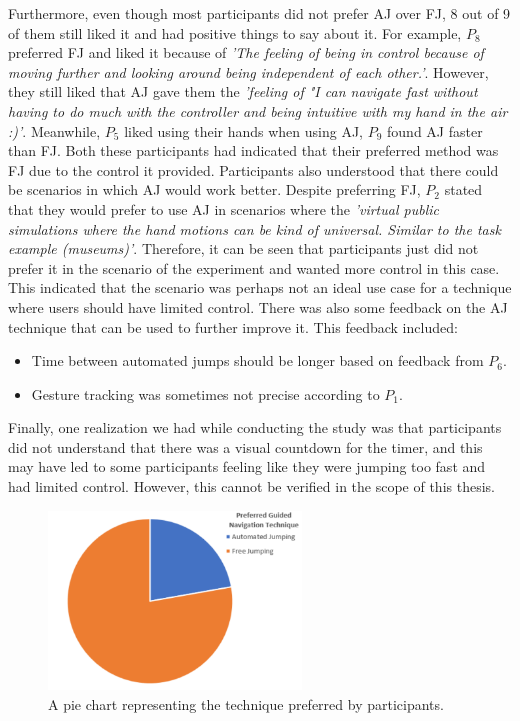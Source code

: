Furthermore, even though most participants did not prefer AJ over FJ, 8 out of 9 of them still liked it and had positive things to say about it. For example, $P_8$ preferred FJ and liked it because of \textit{'The feeling of being in control because of moving further and looking around being independent of each other.'}. However, they still liked that AJ gave them the \textit{'feeling of "I can navigate fast without having to do much with the controller and being intuitive with my hand in the air :)'}. Meanwhile, $P_5$ liked using their hands when using AJ, $P_9$ found AJ faster than FJ. Both these participants had indicated that their preferred method was FJ due to the control it provided. Participants also understood that there could be scenarios in which AJ would work better. Despite preferring FJ, $P_2$ stated that they would prefer to use AJ in scenarios where the \textit{'virtual public simulations where the hand motions can be kind of universal. Similar to the task example (museums)'}. Therefore, it can be seen that participants just did not prefer it in the scenario of the experiment and wanted more control in this case. This indicated that the scenario was perhaps not an ideal use case for a technique where users should have limited control. There was also some feedback on the AJ technique that can be used to further improve it. This feedback included:
\begin{itemize}
	\item Time between automated jumps should be longer based on feedback from $P_6$.
	\item Gesture tracking was sometimes not precise according to $P_1$.
\end{itemize}

Finally, one realization we had while conducting the study was that participants did not understand that there was a visual countdown for the timer, and this may have led to some participants feeling like they were jumping too fast and had limited control. However, this cannot be verified in the scope of this thesis.

\begin{figure}[]
	\centering
	\includegraphics[width=0.6\textwidth]{images/comparison-chart.pdf}
	\caption{A pie chart representing the technique preferred by participants.}
	\label{fig:comparison}
\end{figure}
